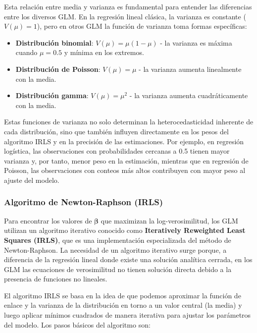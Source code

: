 \documentclass[
  letterpaper,
  DIV=11,
  numbers=noendperiod]{scrreprt}
\providecommand{\tightlist}{%
  \setlength{\itemsep}{0pt}\setlength{\parskip}{0pt}}
\begin{document}
Esta relación entre media y varianza es fundamental para entender las
diferencias entre los diversos GLM. En la regresión lineal clásica, la
varianza es constante (\(V(\mu) = 1\)), pero en otros GLM la función de
varianza toma formas específicas:

\begin{itemize}
\tightlist
\item
  \textbf{Distribución binomial}: \(V(\mu) = \mu(1-\mu)\) - la varianza
  es máxima cuando \(\mu = 0.5\) y mínima en los extremos.
\item
  \textbf{Distribución de Poisson}: \(V(\mu) = \mu\) - la varianza
  aumenta linealmente con la media.
\item
  \textbf{Distribución gamma}: \(V(\mu) = \mu^2\) - la varianza aumenta
  cuadráticamente con la media.
\end{itemize}

Estas funciones de varianza no solo determinan la heterocedasticidad
inherente de cada distribución, sino que también influyen directamente
en los pesos del algoritmo IRLS y en la precisión de las estimaciones.
Por ejemplo, en regresión logística, las observaciones con
probabilidades cercanas a 0.5 tienen mayor varianza y, por tanto, menor
peso en la estimación, mientras que en regresión de Poisson, las
observaciones con conteos más altos contribuyen con mayor peso al ajuste
del modelo.

\subsubsection{Algoritmo de Newton-Raphson
(IRLS)}\label{algoritmo-de-newton-raphson-irls}

Para encontrar los valores de \(\boldsymbol{\beta}\) que maximizan la
log-verosimilitud, los GLM utilizan un algoritmo iterativo conocido como
\textbf{Iteratively Reweighted Least Squares (IRLS)}, que es una
implementación especializada del método de Newton-Raphson. La necesidad
de un algoritmo iterativo surge porque, a diferencia de la regresión
lineal donde existe una solución analítica cerrada, en los GLM las
ecuaciones de verosimilitud no tienen solución directa debido a la
presencia de funciones no lineales.

El algoritmo IRLS se basa en la idea de que podemos aproximar la función
de enlace y la varianza de la distribución en torno a un valor central
(la media) y luego aplicar mínimos cuadrados de manera iterativa para
ajustar los parámetros del modelo. Los pasos básicos del algoritmo son:
\end{document}
